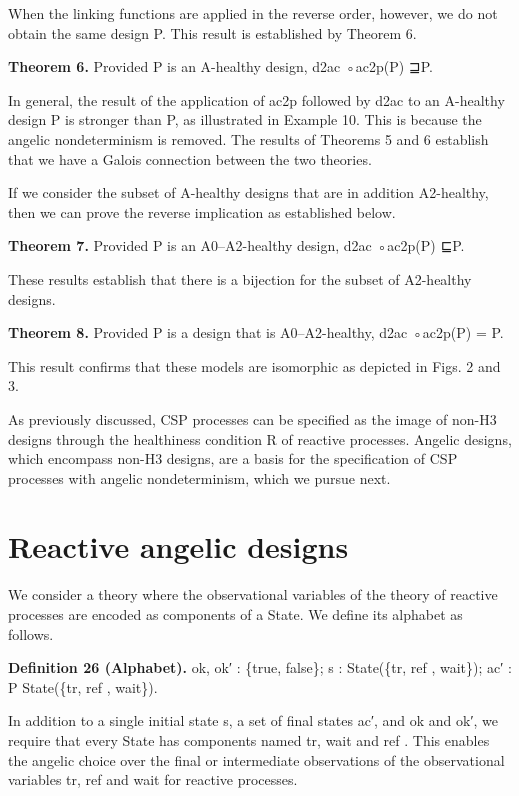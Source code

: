 \documentclass[11pt]{article}
\begin{document}
When the linking functions are applied in the reverse order, however, we do not obtain the same design P. This result is established by Theorem 6.

\noindent\textbf{Theorem 6.} Provided P is an A-healthy design, d2ac ◦ac2p(P) ⊒P.


In general, the result of the application of ac2p followed by d2ac to an A-healthy design P is stronger than P, as illustrated in Example 10. This is because the angelic nondeterminism is removed. The results of Theorems 5 and 6 establish that we have a Galois connection between the two theories.

If we consider the subset of A-healthy designs that are in addition A2-healthy, then we can prove the reverse implication as established below.

\noindent\textbf{Theorem 7.} Provided P is an A0–A2-healthy design, d2ac ◦ac2p(P) ⊑P.


These results establish that there is a bijection for the subset of A2-healthy designs.

\noindent\textbf{Theorem 8.} Provided P is a design that is A0–A2-healthy, d2ac ◦ac2p(P) = P.


This result confirms that these models are isomorphic as depicted in Figs. 2 and 3.

As previously discussed, CSP processes can be specified as the image of non-H3 designs through the healthiness condition R of reactive processes. Angelic designs, which encompass non-H3 designs, are a basis for the specification of CSP processes with angelic nondeterminism, which we pursue next.

\section{Reactive angelic designs}
We consider a theory where the observational variables of the theory of reactive processes are encoded as components of a State. We define its alphabet as follows.

\noindent\textbf{Definition 26 (Alphabet).} ok, ok′ : \{true, false\}; s : State(\{tr, ref , wait\}); ac′ : P State(\{tr, ref , wait\}).


In addition to a single initial state s, a set of final states ac′, and ok and ok′, we require that every State has components named tr, wait and ref . This enables the angelic choice over the final or intermediate observations of the observational variables tr, ref and wait for reactive processes.
\end{document}
